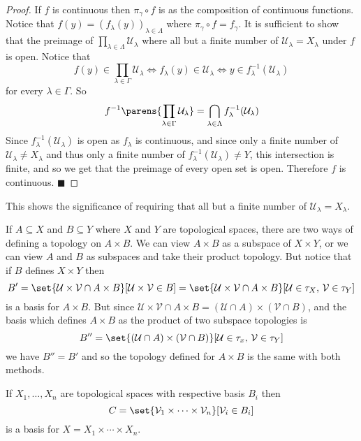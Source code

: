 \documentclass[10pt]{article}
\def\qed{\hskip1cm\penalty-100\hbox{}\hfill$\blacksquare$}
\def\mU{\mathcal{U}}
\def\mV{\mathcal{V}}
\begin{document}
\begin{proof}

    If $f$ is continuous then $\pi_\gamma\circ f$ is as the composition of continuous functions.
    Notice that $f(y)=(f_\lambda(y))_{\lambda\in\Lambda}$ where $\pi_\gamma\circ f=f_\gamma$.
    It is sufficient to show that the preimage of $\prod_{\lambda\in\Lambda}\mU_\lambda$ where all but a finite number of $\mU_\lambda=X_\lambda$ under $f$ is open.
    Notice that
    \[ f(y) \in \prod_{\lambda\in\Gamma}\mU_\lambda \iff f_\lambda(y) \in \mU_\lambda \iff y\in f^{-1}_\lambda(\mU_\lambda) \]
    for every $\lambda\in\Gamma$.
    So
    \[ f^{-1}\parens{\prod_{\lambda\in\Gamma}\mU_\lambda} = \bigcap_{\lambda\in\Lambda}f_\lambda^{-1}(\mU_\lambda) \]
    Since $f_\lambda^{-1}(\mU_\lambda)$ is open as $f_\lambda$ is continuous, and since only a finite number of $\mU_\lambda\neq X_\lambda$ and thus only a finite number of
    $f_\lambda^{-1}(\mU_\lambda)\neq Y$, this intersection is finite, and so we get that the preimage of every open set is open.
    Therefore $f$ is continuous.
    \qed

\end{proof}

This shows the significance of requiring that all but a finite number of $\mU_\lambda=X_\lambda$.

If $A\subseteq X$ and $B\subseteq Y$ where $X$ and $Y$ are topological spaces, there are two ways of defining a topology on $A\times B$.
We can view $A\times B$ as a subspace of $X\times Y$, or we can view $A$ and $B$ as subspaces and take their product topology.
But notice that if $B$ defines $X\times Y$ then
\[ B' = \set{\mU\times\mV\cap A\times B}[\mU\times\mV\in B] = \set{\mU\times\mV\cap A\times B}[\mU\in\tau_X,\,\mV\in\tau_Y] \]
is a basis for $A\times B$.
But since $\mU\times\mV\cap A\times B=(\mU\cap A)\times(\mV\cap B)$, and the basis which defines $A\times B$ as the product of two subspace topologies is
\[ B'' = \set{(\mU\cap A)\times(\mV\cap B)}[\mU\in\tau_x,\,\mV\in\tau_Y] \]
we have $B''=B'$ and so the topology defined for $A\times B$ is the same with both methods.

\begin{prop*}

    If $X_1,\dots,X_n$ are topological spaces with respective basis $B_i$ then
    \[ C = \set{\mV_1\times\cdots\times\mV_n}[\mV_i\in B_i] \]
    is a basis for $X=X_1\times\cdots\times X_n$.

\end{prop*}
\end{document}
